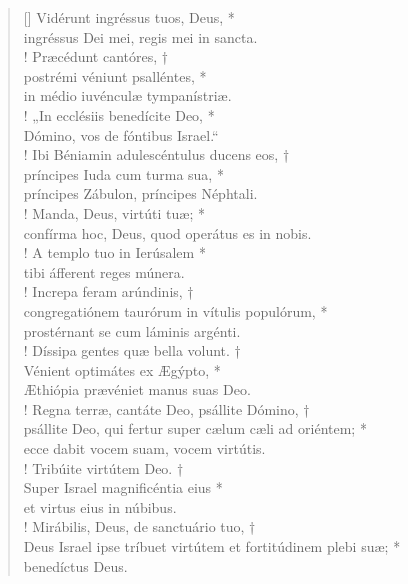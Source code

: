 \begin{verse}[\versewidth]
Vidérunt ingréssus tuos, Deus, *\\
ingréssus Dei mei, regis mei in sancta.\\!
\vin Præcédunt cantóres, †\\
\vin postrémi véniunt psalléntes, *\\
\vin in médio iuvénculæ tympanístriæ.\\!
„In ecclésiis benedícite Deo, *\\
Dómino, vos de fóntibus Israel.“\\!
\vin Ibi Béniamin adulescéntulus ducens eos, †\\
\vin príncipes Iuda cum turma sua, *\\
\vin príncipes Zábulon, príncipes Néphtali.\\!
Manda, Deus, virtúti tuæ; *\\
confírma hoc, Deus, quod operátus es in nobis.\\!
\vin A templo tuo in Ierúsalem *\\
\vin tibi áfferent reges múnera.\\!
Increpa feram arúndinis, †\\
congregatiónem taurórum in vítulis populórum, *\\
prostérnant se cum láminis argénti.\\!
\vin Díssipa gentes quæ bella volunt. †\\
\vin Vénient optimátes ex Ægýpto, *\\
\vin Æthiópia prævéniet manus suas Deo.\\!
Regna terræ, cantáte Deo, psállite Dómino, †\\
psállite Deo, qui fertur super cælum cæli ad oriéntem; *\\
ecce dabit vocem suam, vocem virtútis.\\!
\vin Tribúite virtútem Deo. †\\
\vin Super Israel magnificéntia eius *\\
\vin et virtus eius in núbibus.\\!
Mirábilis, Deus, de sanctuário tuo, †\\
Deus Israel ipse tríbuet virtútem et fortitúdinem plebi suæ; *\\
benedíctus Deus.\\
\end{verse}
\vspace{1cm}



